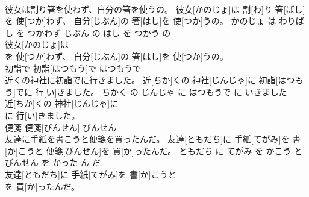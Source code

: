 \documentclass[8pt]{extreport}
\begin{document}
\begin{CJK}{UTF8}{min}
\\	彼女は割り箸を使わず、自分の箸を使うの。	彼女[かのじょ]は 割[わ]り 箸[ばし]を 使[つか]わず、 自分[じぶん]の 箸[はし]を 使[つか]うの。	かのじょ は わりばし を つかわず じぶん の はし を つかう の	
\\	彼女[かのじょ]は
\\	を 使[つか]わず、 自分[じぶん]の 箸[はし]を 使[つか]うの。			
\\	初詣で	初詣[はつもう]で	はつもうで	
\\	近くの神社に初詣でに行きました。	近[ちか]くの 神社[じんじゃ]に 初詣[はつもう]でに 行[い]きました。	ちかく の じんじゃ に はつもうで に いきました	
\\	近[ちか]くの 神社[じんじゃ]に
\\	に 行[い]きました。			
\\	便箋	便箋[びんせん]	びんせん	
\\	友達に手紙を書こうと便箋を買ったんだ。	友達[ともだち]に 手紙[てがみ]を 書[か]こうと 便箋[びんせん]を 買[か]ったんだ。	ともだち に てがみ を かこう と びんせん を かった ん だ	
\\	友達[ともだち]に 手紙[てがみ]を 書[か]こうと
\\	を 買[か]ったんだ。			
\end{CJK}
\end{document}
